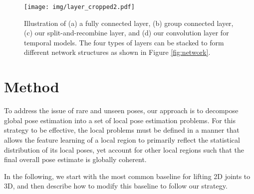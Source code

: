\documentclass[runningheads]{llncs}
\begin{document}
\begin{comment}
Group convolution (GConv) utilizes a kind of sparse connection, which can decrease the parameters and network complexity, which are easy to be implemented in existing deep learning frameworks\cite{howard2017mobilenets,ma2018shufflenet,sandler2018mobilenetv2}. Although this convolution can make network efficient and processing faster, in the meanwhile, it will ruin performance by making information stuck among different channels if no more operator introduced. However, in this work, it is novel to make use of the advantages (fewer parameters) and bypass the disadvantages (information stuck) of the GConv in spatial information. Splitting the whole pose into different groups can distort the redundancy of fully connection, learn local parts well with different difficulties, and improve the generalization of unseen pose.

\end{comment}





\begin{figure}[b]
\begin{center}
\texttt{[image: img/layer\_cropped2.pdf]}
\end{center}
  \caption{Illustration of (a) a fully connected layer, (b) group connected layer, (c) our split-and-recombine layer, and (d) our convolution layer for temporal models. The four types of layers can be stacked to form different network structures as shown in Figure \ref{fig:network}. }
\label{fig:layer}
\end{figure}


\section{Method}
\label{sec:method}
To address the issue of rare and unseen poses, our approach is to decompose global pose estimation into a set of local pose estimation problems. For this strategy to be effective, the local problems must be defined in a manner that allows the feature learning of a local region to primarily reflect the statistical distribution of its local poses, yet account for other local regions such that the final overall pose estimate is globally coherent.

In the following, we start with the most common baseline for lifting 2D joints to 3D, and then describe how to modify this baseline to follow our strategy.
\end{document}
